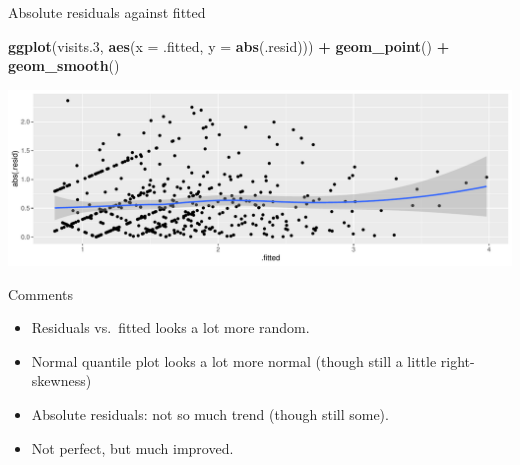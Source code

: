 \documentclass[
  ignorenonframetext,
]{beamer}
\newenvironment{Shaded}{\begin{snugshade}}{\end{snugshade}}
\newcommand{\DataTypeTok}[1]{\textcolor[rgb]{0.13,0.29,0.53}{#1}}
\newcommand{\FloatTok}[1]{\textcolor[rgb]{0.00,0.00,0.81}{#1}}
\newcommand{\KeywordTok}[1]{\textcolor[rgb]{0.13,0.29,0.53}{\textbf{#1}}}
\newcommand{\NormalTok}[1]{#1}
\newcommand{\OperatorTok}[1]{\textcolor[rgb]{0.81,0.36,0.00}{\textbf{#1}}}
\newcommand{\StringTok}[1]{\textcolor[rgb]{0.31,0.60,0.02}{#1}}
\begin{document}
\begin{frame}[fragile]{Absolute residuals against fitted}
\protect\hypertarget{absolute-residuals-against-fitted}{}

\begin{Shaded}
\begin{Highlighting}[]
\KeywordTok{ggplot}\NormalTok{(visits}\FloatTok{.3}\NormalTok{, }\KeywordTok{aes}\NormalTok{(}\DataTypeTok{x =}\NormalTok{ .fitted, }\DataTypeTok{y =} \KeywordTok{abs}\NormalTok{(.resid))) }\OperatorTok{+}
\StringTok{  }\KeywordTok{geom_point}\NormalTok{() }\OperatorTok{+}\StringTok{ }\KeywordTok{geom_smooth}\NormalTok{()}
\end{Highlighting}
\end{Shaded}

\includegraphics{slides_d29_files/figure-beamer/unnamed-chunk-69-1.pdf}

\end{frame}

\begin{frame}{Comments}
\protect\hypertarget{comments-7}{}

\begin{itemize}
\item
  Residuals vs.~fitted looks a lot more random.
\item
  Normal quantile plot looks a lot more normal (though still a little
  right-skewness)
\item
  Absolute residuals: not so much trend (though still some).
\item
  Not perfect, but much improved.
\end{itemize}

\end{frame}
\end{document}
